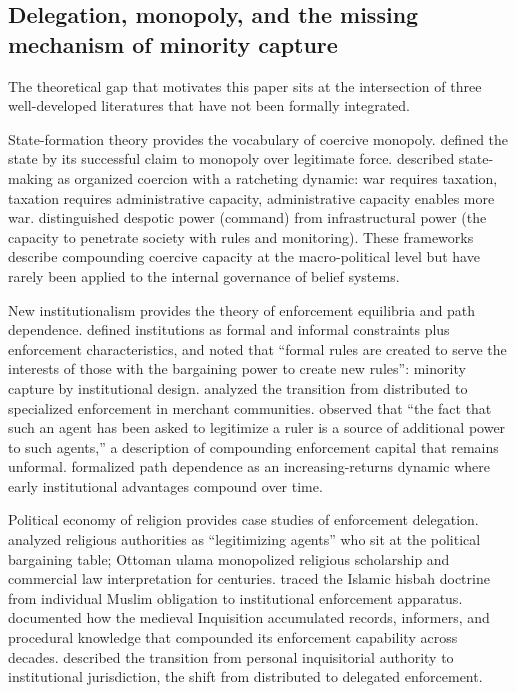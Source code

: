 \documentclass[12pt]{article}
\begin{document}
\subsection{Delegation, monopoly, and the missing mechanism of minority capture}

The theoretical gap that motivates this paper sits at the intersection of three well-developed literatures that have not been formally integrated.

State-formation theory provides the vocabulary of coercive monopoly. \citet{weber1946} defined the state by its successful claim to monopoly over legitimate force. \citet{tilly1985} described state-making as organized coercion with a ratcheting dynamic: war requires taxation, taxation requires administrative capacity, administrative capacity enables more war. \citet{mann1986} distinguished despotic power (command) from infrastructural power (the capacity to penetrate society with rules and monitoring). These frameworks describe compounding coercive capacity at the macro-political level but have rarely been applied to the internal governance of belief systems.

New institutionalism provides the theory of enforcement equilibria and path dependence. \citet{north1990} defined institutions as formal and informal constraints plus enforcement characteristics, and noted that ``formal rules are created to serve the interests of those with the bargaining power to create new rules'': minority capture by institutional design. \citet{greif2006} analyzed the transition from distributed to specialized enforcement in merchant communities. \citet{greif2016} observed that ``the fact that such an agent has been asked to legitimize a ruler is a source of additional power to such agents,'' a description of compounding enforcement capital that remains unformal. \citet{pierson2000} formalized path dependence as an increasing-returns dynamic where early institutional advantages compound over time.

Political economy of religion provides case studies of enforcement delegation. \citet{rubin2017} analyzed religious authorities as ``legitimizing agents'' who sit at the political bargaining table; Ottoman ulama monopolized religious scholarship and commercial law interpretation for centuries. \citet{cook2000} traced the Islamic hisbah doctrine from individual Muslim obligation to institutional enforcement apparatus. \citet{given1997} documented how the medieval Inquisition accumulated records, informers, and procedural knowledge that compounded its enforcement capability across decades. \citet{kelly1989} described the transition from personal inquisitorial authority to institutional jurisdiction, the shift from distributed to delegated enforcement.
\end{document}
